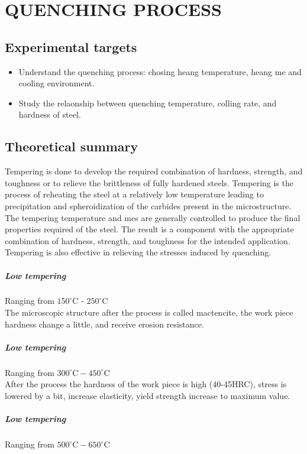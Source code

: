 \chapter{QUENCHING PROCESS}
\section{Experimental targets}
\begin{itemize}
	\item Understand  the  quenching  process:  chosing  heang  temperature,  heang  me  and  cooling environment.
	\item Study the relaonship between quenching temperature, colling rate, and hardness of steel.
\end{itemize}
\section{Theoretical summary}
Tempering is done to develop the required combination of hardness, strength, and toughness or to relieve the brittleness of fully hardened steels. Tempering is the process of reheating the steel at a relatively low temperature leading to precipitation and spheroidization of the carbides present in the microstructure. The tempering temperature and mes are generally controlled to produce the final properties required of the steel. The result is a component with the appropriate combination of hardness,  strength,  and  toughness  for  the  intended  application.  Tempering  is  also  effective  in relieving the stresses induced by quenching.
\paragraph{Low tempering} Ranging from $ 150^\circ$C - $250^\circ$C\\
The  microscopic  structure  after  the  process  is  called mactencite,  the  work piece  hardness  change a little, and receive erosion resistance.
\paragraph{Low tempering} Ranging from $ 300^\circ\text{C}- 450^\circ\text{C}$\\
After the process the hardness of the work piece is high (40-45HRC), stress is lowered by a bit, increase elasticity, yield strength increase to maximum value.
\paragraph{Low tempering} Ranging from $ 500^\circ\text{C} - 650^\circ\text{C}$
